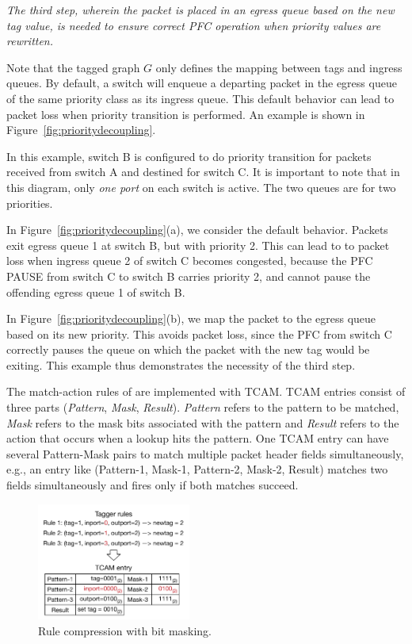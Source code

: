 {\em The third step, wherein the packet is placed in an egress queue based on the
{\em new} tag value, is needed to ensure correct PFC operation when priority
values are rewritten.}

Note that the tagged graph $G$ only defines the mapping between tags and ingress
queues. By default, a switch will enqueue a departing packet in the egress queue
of the same priority class as its ingress queue. This default behavior can lead
to packet loss when priority transition is performed. An example is shown in
Figure~\ref{fig:prioritydecoupling}.

In this example, switch B is configured to do priority transition for packets
received from switch A and destined for switch C. It is important to note that
in this diagram, only {\em one port} on each switch is active. The two queues
are for two priorities.

In Figure~\ref{fig:prioritydecoupling}(a), we consider the default behavior.
Packets exit egress queue 1 at switch B, but with priority 2.  This can lead to
to packet loss when ingress queue 2 of switch C becomes congested, because
the PFC PAUSE from switch C to switch B carries priority 2, and cannot pause
the offending egress queue 1 of switch B.

In Figure~\ref{fig:prioritydecoupling}(b), we map the packet to the egress queue
based on its new priority.  This avoids packet loss, since the PFC from switch C
correctly pauses the queue on which the packet with the new tag would be
exiting. This example thus demonstrates the necessity of the third step.

  The match-action rules of \sysname{}
are implemented with TCAM. TCAM entries consist of three parts ({\em Pattern},
{\em Mask}, {\em Result}). {\em Pattern} refers to the pattern to be matched, {\em
Mask} refers to the mask bits associated with the pattern and {\em Result}
refers to the action that occurs when a lookup hits the pattern.  One TCAM entry
can have several Pattern-Mask pairs to match multiple packet header fields
simultaneously, e.g., an entry like (Pattern-1, Mask-1, Pattern-2, Mask-2, Result)
matches two fields simultaneously and fires only if both matches succeed.

\begin{figure}
	\centering
	\includegraphics[width=0.45\textwidth] {figs/compression_with_bitmasking}
	\caption{Rule compression with bit masking.}\label{fig:compression}
    \vspace{-1em}	
\end{figure}

